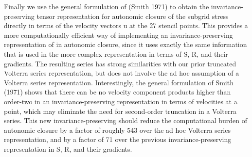 Finally we use the general formulation of (Smith 1971) to obtain the invariance-preserving tensor representation for autonomic closure of the subgrid stress   directly in terms of the velocity vectors u at the 27 stencil points. This provides a more computationally efficient way of implementing an invariance-preserving representation of   in autonomic closure, since it uses exactly the same information that is used in the more complex representation in terms of S, R, and their gradients.  The resulting series has strong similarities with our prior truncated Volterra series representation, but does not involve the ad hoc assumption of a Volterra series representation. Interestingly, the general formulation of Smith (1971) shows that there can be no velocity component products higher than order-two in an invariance-preserving representation in terms of velocities at a point, which may eliminate the need for second-order truncation in a Volterra series. This new invariance-preserving should reduce the computational burden of autonomic closure by a factor of roughly 543 over the ad hoc Volterra series representation, and by a factor of 71 over the previous invariance-preserving representation in S, R, and their gradients.
